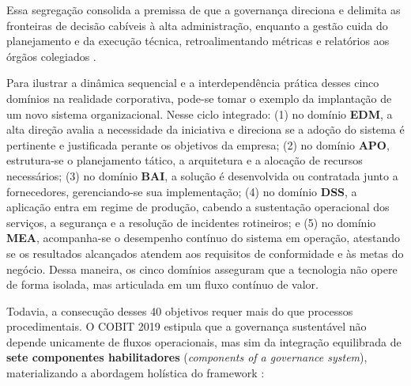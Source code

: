Essa segregação consolida a premissa de que a governança direciona e delimita as fronteiras de decisão cabíveis à alta administração, enquanto a gestão cuida do planejamento e da execução técnica, retroalimentando métricas e relatórios aos órgãos colegiados \cite{weill2004governance,isaca2019framework}.

Para ilustrar a dinâmica sequencial e a interdependência prática desses cinco domínios na realidade corporativa, pode-se tomar o exemplo da implantação de um novo sistema organizacional. Nesse ciclo integrado: (1) no domínio \textbf{EDM}, a alta direção avalia a necessidade da iniciativa e direciona se a adoção do sistema é pertinente e justificada perante os objetivos da empresa; (2) no domínio \textbf{APO}, estrutura-se o planejamento tático, a arquitetura e a alocação de recursos necessários; (3) no domínio \textbf{BAI}, a solução é desenvolvida ou contratada junto a fornecedores, gerenciando-se sua implementação; (4) no domínio \textbf{DSS}, a aplicação entra em regime de produção, cabendo a sustentação operacional dos serviços, a segurança e a resolução de incidentes rotineiros; e (5) no domínio \textbf{MEA}, acompanha-se o desempenho contínuo do sistema em operação, atestando se os resultados alcançados atendem aos requisitos de conformidade e às metas do negócio. Dessa maneira, os cinco domínios asseguram que a tecnologia não opere de forma isolada, mas articulada em um fluxo contínuo de valor.

Todavia, a consecução desses 40 objetivos requer mais do que processos procedimentais. O COBIT 2019 estipula que a governança sustentável não depende unicamente de fluxos operacionais, mas sim da integração equilibrada de \textbf{sete componentes habilitadores} (\textit{components of a governance system}), materializando a abordagem holística do framework \cite{isaca2019framework,isaca2019governance}:

